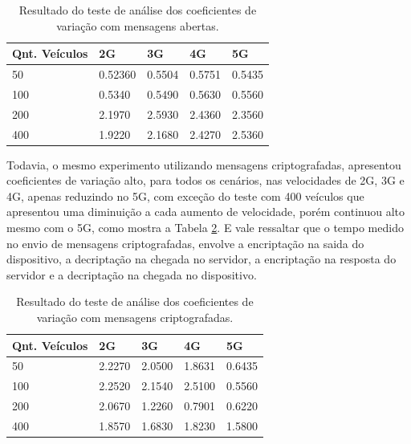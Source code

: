 \documentclass[
	12pt,				%
	oneside,			%
	a4paper,			%
	english,			%
	brazil				%
	]{abntex2ppgsi}
\begin{document}
\begin{table}[!h]
	\centering
	\caption{Resultado do teste de análise dos coeficientes de variação com mensagens abertas.}
	\label{tbEstatisticaVariacoes}
	\begin{tabular}{|p{4.0cm}|p{2.0cm}|p{2.0cm}|p{2.0cm}|p{2.0cm}|}
		\hline
		\rowcolor[gray]{0.7}
		Qnt. Veículos & 2G      & 3G     & 4G     & 5G      \\ \hline
		\cellcolor[gray]{0.7}50              & 0.52360 & 0.5504 & 0.5751 & 0.5435 \\ \hline
		\cellcolor[gray]{0.7}100             & 0.5340  & 0.5490 & 0.5630 & 0.5560  \\ \hline
		\cellcolor[gray]{0.7}200             & 2.1970  & 2.5930 & 2.4360 & 2.3560  \\ \hline
		\cellcolor[gray]{0.7}400             & 1.9220  & 2.1680 & 2.4270 & 2.5360  \\ \hline
	\end{tabular}
\end{table}

Todavia, o mesmo experimento utilizando mensagens criptografadas, apresentou coeficientes de variação alto, para todos os cenários, nas velocidades de 2G, 3G e 4G, apenas reduzindo no 5G, com exceção do teste com 400 veículos que apresentou uma diminuição a cada aumento de velocidade, porém continuou alto mesmo com o 5G, como mostra a Tabela \ref{tbEstatisticaVariacoesencript}. E vale ressaltar que o tempo medido no envio de mensagens criptografadas, envolve a encriptação na saida do dispositivo, a decriptação na chegada no servidor, a encriptação na resposta do servidor e a decriptação na chegada no dispositivo.

\begin{table}[!h]
	\centering
	\caption{Resultado do teste de análise dos coeficientes de variação com mensagens criptografadas.}
	\label{tbEstatisticaVariacoesencript}
	\begin{tabular}{|p{4.0cm}|p{2.0cm}|p{2.0cm}|p{2.0cm}|p{2.0cm}|}
		\hline
		\rowcolor[gray]{0.7}
		Qnt. Veículos & 2G      & 3G     & 4G     & 5G      \\ \hline
		\cellcolor[gray]{0.7}50              & 2.2270 & 2.0500 & 1.8631 & 0.6435 \\ \hline
		\cellcolor[gray]{0.7}100             & 2.2520  & 2.1540 & 2.5100 & 0.5560  \\ \hline
		\cellcolor[gray]{0.7}200             & 2.0670  & 1.2260 & 0.7901 & 0.6220  \\ \hline
		\cellcolor[gray]{0.7}400             & 1.8570  & 1.6830 & 1.8230 & 1.5800  \\ \hline
	\end{tabular}
\end{table}
\end{document}
